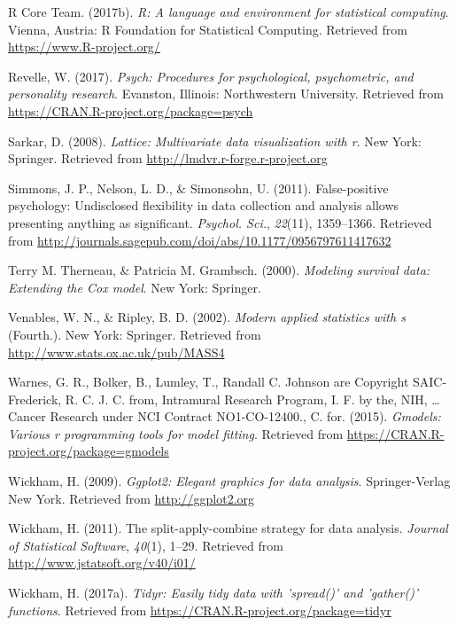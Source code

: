 \documentclass[english,man]{apa6}
\theoremstyle{definition}
\theoremstyle{definition}
\theoremstyle{remark}
\begin{document}
\hypertarget{ref-R-base}{}
R Core Team. (2017b). \emph{R: A language and environment for
statistical computing}. Vienna, Austria: R Foundation for Statistical
Computing. Retrieved from \url{https://www.R-project.org/}

\hypertarget{ref-R-psych}{}
Revelle, W. (2017). \emph{Psych: Procedures for psychological,
psychometric, and personality research}. Evanston, Illinois:
Northwestern University. Retrieved from
\url{https://CRAN.R-project.org/package=psych}

\hypertarget{ref-R-lattice}{}
Sarkar, D. (2008). \emph{Lattice: Multivariate data visualization with
r}. New York: Springer. Retrieved from
\url{http://lmdvr.r-forge.r-project.org}

\hypertarget{ref-Simmons2011-za}{}
Simmons, J. P., Nelson, L. D., \& Simonsohn, U. (2011). False-positive
psychology: Undisclosed flexibility in data collection and analysis
allows presenting anything as significant. \emph{Psychol. Sci.},
\emph{22}(11), 1359--1366. Retrieved from
\url{http://journals.sagepub.com/doi/abs/10.1177/0956797611417632}

\hypertarget{ref-R-survival-book}{}
Terry M. Therneau, \& Patricia M. Grambsch. (2000). \emph{Modeling
survival data: Extending the Cox model}. New York: Springer.

\hypertarget{ref-R-MASS}{}
Venables, W. N., \& Ripley, B. D. (2002). \emph{Modern applied
statistics with s} (Fourth.). New York: Springer. Retrieved from
\url{http://www.stats.ox.ac.uk/pub/MASS4}

\hypertarget{ref-R-gmodels}{}
Warnes, G. R., Bolker, B., Lumley, T., Randall C. Johnson are Copyright
SAIC-Frederick, R. C. J. C. from, Intramural Research Program, I. F. by
the, NIH, \ldots{} Cancer Research under NCI Contract NO1-CO-12400., C.
for. (2015). \emph{Gmodels: Various r programming tools for model
fitting}. Retrieved from
\url{https://CRAN.R-project.org/package=gmodels}

\hypertarget{ref-R-ggplot2}{}
Wickham, H. (2009). \emph{Ggplot2: Elegant graphics for data analysis}.
Springer-Verlag New York. Retrieved from \url{http://ggplot2.org}

\hypertarget{ref-R-plyr}{}
Wickham, H. (2011). The split-apply-combine strategy for data analysis.
\emph{Journal of Statistical Software}, \emph{40}(1), 1--29. Retrieved
from \url{http://www.jstatsoft.org/v40/i01/}

\hypertarget{ref-R-tidyr}{}
Wickham, H. (2017a). \emph{Tidyr: Easily tidy data with 'spread()' and
'gather()' functions}. Retrieved from
\url{https://CRAN.R-project.org/package=tidyr}
\end{document}
